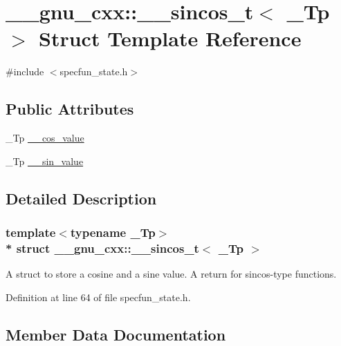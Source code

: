 \hypertarget{struct____gnu__cxx_1_1____sincos__t}{}\section{\+\_\+\+\_\+gnu\+\_\+cxx\+:\+:\+\_\+\+\_\+sincos\+\_\+t$<$ \+\_\+\+Tp $>$ Struct Template Reference}
\label{struct____gnu__cxx_1_1____sincos__t}


{\ttfamily \#include $<$specfun\+\_\+state.\+h$>$}

\subsection*{Public Attributes}
\begin{DoxyCompactItemize}
\item 
\+\_\+\+Tp \hyperlink{struct____gnu__cxx_1_1____sincos__t_a576e454b7c18f9f52a8f0e97fc3eec87}{\+\_\+\+\_\+cos\+\_\+value}
\item 
\+\_\+\+Tp \hyperlink{struct____gnu__cxx_1_1____sincos__t_ab33398e9213fa67fdd770c70d5f99953}{\+\_\+\+\_\+sin\+\_\+value}
\end{DoxyCompactItemize}


\subsection{Detailed Description}
\subsubsection*{template$<$typename \+\_\+\+Tp$>$\\*
struct \+\_\+\+\_\+gnu\+\_\+cxx\+::\+\_\+\+\_\+sincos\+\_\+t$<$ \+\_\+\+Tp $>$}

A struct to store a cosine and a sine value. A return for sincos-\/type functions. 

Definition at line 64 of file specfun\+\_\+state.\+h.



\subsection{Member Data Documentation}

